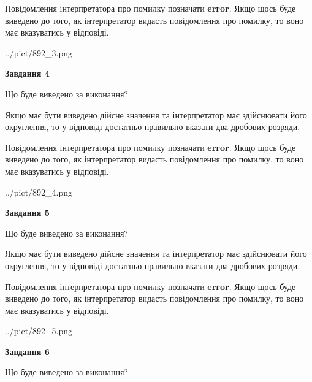 \documentclass[12pt, ukrainian]{article}
\begin{document}
{\begin {Large}
Повідомлення інтерпретатора про помилку позначати \textbf{error}.
Якщо щось буде виведено до того, як інтерпретатор видасть повідомлення про помилку, 
то воно має вказуватись у відповіді. \par

\begin{center}
	{../pict/892_3.png}
\end{center}
\newpage

{\begin {center}\textbf{Завдання 4}\end {center}}\par
Що буде виведено за виконання? \par

Якщо має бути виведено дійсне значення та інтерпретатор має здійснювати його округлення, 
то у відповіді достатньо правильно вказати два дробових розряди.

Повідомлення інтерпретатора про помилку позначати \textbf{error}.
Якщо щось буде виведено до того, як інтерпретатор видасть повідомлення про помилку, 
то воно має вказуватись у відповіді. \par

\begin{center}
	{../pict/892_4.png}
\end{center}
\newpage

{\begin {center}\textbf{Завдання 5}\end {center}}\par
Що буде виведено за виконання? \par

Якщо має бути виведено дійсне значення та інтерпретатор має здійснювати його округлення, 
то у відповіді достатньо правильно вказати два дробових розряди.

Повідомлення інтерпретатора про помилку позначати \textbf{error}.
Якщо щось буде виведено до того, як інтерпретатор видасть повідомлення про помилку, 
то воно має вказуватись у відповіді. \par

\begin{center}
	{../pict/892_5.png}
\end{center}
\newpage

{\begin {center}\textbf{Завдання 6}\end {center}}\par
Що буде виведено за виконання? \par


\end{Large}}
\end{document}
